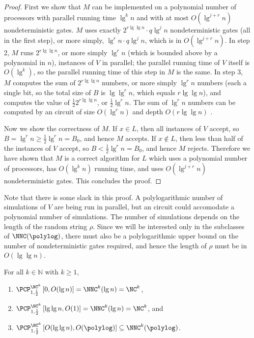 \documentclass[]{article}
\newcommand{\PCPcs}[5]{\PCP^{#1}_{#2, #3}\left[#4, #5\right]}
\begin{document}
\begin{proof}
  First we show that $M$ can be implemented on a polynomial number of processors with parallel running time $\lg^k n$ and with at most $O(\lg^{j + r} n)$ nondeterministic gates.
  $M$ uses exactly $2^{r \lg \lg n}\cdot q \lg^j n$ nondeterministic gates (all in the first step), or more simply, $\lg^r n \cdot q \lg^j n$, which is in $O(\lg^{j + r} n)$.
  In step 2, $M$ runs $2^{r \lg \lg n}$, or more simply $\lg^r n$ (which is bounded above by a polynomial in $n$), instances of $V$ in parallel; the parallel running time of $V$ itself is $O(\lg^k)$, so the parallel running time of this step in $M$ is the same.
  In step 3, $M$ computes the sum of $2^{r \lg \lg n}$ numbers, or more simply $\lg^r n$ numbers (each a single bit, so the total size of $B$ is $\lg \lg^r n$, which equals $r \lg \lg n$), and computes the value of $\frac{1}{2} 2^{r \lg \lg n}$, or $\frac{1}{2} \lg^r n$.
  The sum of $\lg^r n$ numbers can be computed by an \NC{} circuit of size $O(\lg^r n)$ and depth $O(r \lg \lg n)$ \cite[Theorem~2.6.1]{savage98}.

  Now we show the correctness of $M$.
  If $x \in L$, then all instances of $V$ accept, so $B = \lg^r n \geq \frac{1}{2} \lg^r n = B_0$, and hence $M$ accepts.
  If $x \notin L$, then less than half of the instances of $V$ accept, so $B < \frac{1}{2} \lg^r n = B_0$, and hence $M$ rejects.
  Therefore we have shown that $M$ is a correct algorithm for $L$ which uses a polynomial number of processors, has $O(\lg^k n)$ running time, and uses $O(\lg^{j + r} n)$ nondeterministic gates.
  This concludes the proof.
\end{proof}

Note that there is some slack in this proof.
A polylogarithmic number of simulations of $V$ are being run in parallel, but an \NNC{} circuit could accomodate a polynomial number of simulations.
The number of simulations depends on the length of the random string $\rho$.
Since we will be interested only in the subclasses of $\NNC(\polylog)$, there must also be a polylogarithmic upper bound on the number of nondeterministic gates required, and hence the length of $\rho$ must be in $O(\lg \lg n)$.

\begin{corollary}
  For all $k \in \mathbb{N}$ with $k \geq 1$,
  \begin{enumerate}
  \item $\PCPcs{\NC^k}{1}{\frac{1}{2}}{0}{O(\lg n)} = \NNC^k(\lg n) = \NC^k$,
  \item $\PCPcs{\NC^k}{1}{\frac{1}{2}}{\lg \lg n}{O(1)} = \NNC^k(\lg n) = \NC^k$, and
  \item $\PCPcs{\NC^k}{1}{\frac{1}{2}}{O(\lg \lg n)}{O(\polylog)} \subseteq \NNC^k(\polylog)$.
  \end{enumerate}
\end{corollary}
\end{document}
